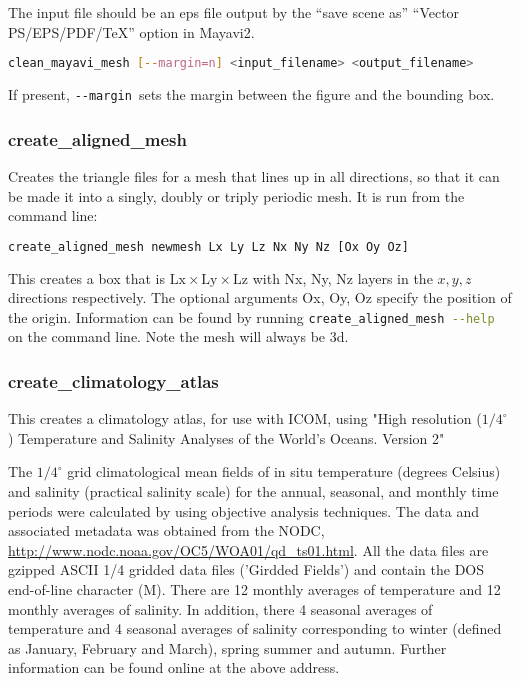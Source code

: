 The input file should be an eps file output by the ``save scene as'' 
``Vector PS/EPS/PDF/TeX'' option in Mayavi2.

\begin{lstlisting}[language = Bash]
clean_mayavi_mesh [--margin=n] <input_filename> <output_filename>
\end{lstlisting}

If present, \lstinline[language = Bash]+--margin+\ sets the margin between
the figure and the bounding box. 


\subsubsection{create\_aligned\_mesh}
\label{sec:create_aligned_mesh}

Creates the triangle files for a mesh that lines up in all directions, so that it can be made it into a singly, doubly or triply periodic mesh. It is run from the command line:

\begin{lstlisting}[language = Bash]
create_aligned_mesh newmesh Lx Ly Lz Nx Ny Nz [Ox Oy Oz]
\end{lstlisting}

This creates a box that is $\mathrm{Lx} \times \mathrm{Ly} \times \mathrm{Lz}$ with Nx, Ny, Nz layers in the $x,y,z$ directions respectively. The optional arguments Ox, Oy, Oz  specify the position of the origin. Information can be found by running \lstinline[language = bash]+create_aligned_mesh --help+ on the command line. Note the mesh will always be 3d.


\subsubsection{create\_climatology\_atlas}
\label{sec:create_climatology_atlas}

This creates a climatology atlas, for use with ICOM, using "High resolution ($1/4 ^\circ$) Temperature and Salinity Analyses of the World's Oceans. Version 2"

The $1/4 ^\circ$ grid climatological mean fields of in situ temperature (degrees Celsius) and salinity (practical salinity scale) for the annual, seasonal, and monthly time periods were calculated by \cite{boyer2005} using objective analysis techniques. The data and associated metadata was obtained from the NODC, \url{http://www.nodc.noaa.gov/OC5/WOA01/qd_ts01.html}. All the data files are gzipped ASCII 1/4 gridded data files ('Girdded Fields') and contain the DOS end-of-line character (M). There are 12 monthly averages of temperature and 12 monthly averages of salinity. In addition, there 4 seasonal averages of temperature and 4 seasonal averages of salinity corresponding to winter (defined as January, February and March), spring summer and autumn. Further information can be found online at the above address.

